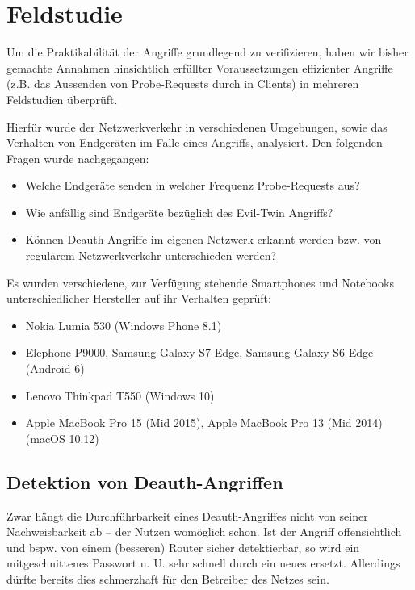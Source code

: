 \section{Feldstudie}
Um die Praktikabilität der Angriffe grundlegend zu verifizieren, haben wir bisher gemachte Annahmen hinsichtlich erfüllter Voraussetzungen effizienter Angriffe (z.B. das Aussenden von Probe-Requests durch in Clients) in mehreren Feldstudien überprüft.

Hierfür wurde der Netzwerkverkehr in verschiedenen Umgebungen, sowie das Verhalten von Endgeräten im Falle eines Angriffs, analysiert.
Den folgenden Fragen wurde nachgegangen:
\begin{itemize}
	\item Welche Endgeräte senden in welcher Frequenz Probe-Requests aus?
	\item Wie anfällig sind Endgeräte bezüglich des Evil-Twin Angriffs?
	\item Können Deauth-Angriffe im eigenen Netzwerk erkannt werden bzw. von regulärem Netzwerkverkehr unterschieden werden?
\end{itemize}

Es wurden verschiedene, zur Verfügung stehende Smartphones und Notebooks unterschiedlicher Hersteller auf ihr Verhalten geprüft:
\begin{itemize}
	\item Nokia Lumia 530 (Windows Phone 8.1)
	\item Elephone P9000, Samsung Galaxy S7 Edge, Samsung Galaxy S6 Edge (Android 6)
	\item Lenovo Thinkpad T550 (Windows 10)
	\item Apple MacBook Pro 15 (Mid 2015), Apple MacBook Pro 13 (Mid 2014) (macOS 10.12)
\end{itemize}

\subsection{Detektion von Deauth-Angriffen}
Zwar hängt die Durchführbarkeit eines Deauth-Angriffes nicht von seiner Nachweisbarkeit ab -- der Nutzen womöglich schon. Ist der Angriff offensichtlich und bspw. von einem (besseren) Router sicher detektierbar, so wird ein mitgeschnittenes Passwort u. U. sehr schnell durch ein neues ersetzt. Allerdings dürfte bereits dies schmerzhaft für den Betreiber des Netzes sein.

